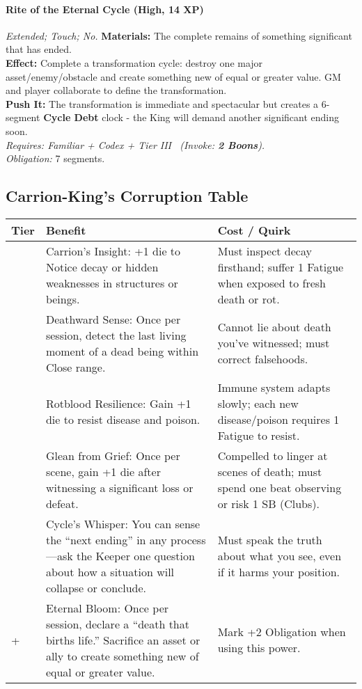 \paragraph{Rite of the Eternal Cycle (High, 14 XP)} \emph{Extended; Touch; No.}
\textbf{Materials:} The complete remains of something significant that has ended. \\
\textbf{Effect:} Complete a transformation cycle: destroy one major asset/enemy/obstacle and create something new of equal or greater value. GM and player collaborate to define the transformation. \\
\textbf{Push It:} The transformation is immediate and spectacular but creates a 6-segment \textbf{Cycle Debt} clock - the King will demand another significant ending soon. \\
\emph{Requires: Familiar + Codex + Tier III \ (\textit{Invoke:} \textbf{2 Boons}).} \\
\emph{Obligation:} 7 segments.

\subsection*{Carrion-King's Corruption Table}
\label{sec:carrion-king-corruption}

\begin{longtable}{>{\raggedright\arraybackslash}p{1cm} p{5cm} p{5cm}}
\toprule
\textbf{Tier} & \textbf{Benefit} & \textbf{Cost / Quirk} \\
\midrule
1 & Carrion's Insight: +1 die to Notice decay or hidden weaknesses in structures or beings. & Must inspect decay firsthand; suffer 1 Fatigue when exposed to fresh death or rot. \\
\midrule
2 & Deathward Sense: Once per session, detect the last living moment of a dead being within Close range. & Cannot lie about death you’ve witnessed; must correct falsehoods. \\
\midrule
3 & Rotblood Resilience: Gain +1 die to resist disease and poison. & Immune system adapts slowly; each new disease/poison requires 1 Fatigue to resist. \\
\midrule
4 & Glean from Grief: Once per scene, gain +1 die after witnessing a significant loss or defeat. & Compelled to linger at scenes of death; must spend one beat observing or risk 1 SB (Clubs). \\
\midrule
5 & Cycle's Whisper: You can sense the “next ending” in any process—ask the Keeper one question about how a situation will collapse or conclude. & Must speak the truth about what you see, even if it harms your position. \\
\midrule
6+ & Eternal Bloom: Once per session, declare a “death that births life.” Sacrifice an asset or ally to create something new of equal or greater value. & Mark +2 Obligation when using this power. \\
\bottomrule
\end{longtable}